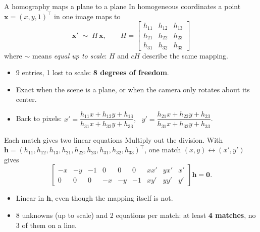 \documentclass[aspectratio=169,11pt]{beamer}
\begin{document}
\begin{frame}{A homography maps a plane to a plane}
  In homogeneous coordinates a point $\mathbf{x}=(x,y,1)^\top$ in one image maps to
  \[
    \mathbf{x}' \;\sim\; H\,\mathbf{x},\qquad
    H=\begin{bmatrix} h_{11}&h_{12}&h_{13}\\ h_{21}&h_{22}&h_{23}\\ h_{31}&h_{32}&h_{33}\end{bmatrix}
  \]
  where $\sim$ means \emph{equal up to scale}: $H$ and $cH$ describe the same mapping.
  \vspace{.6em}
  \begin{itemize}\setlength{\itemsep}{.45em}
    \item 9 entries, 1 lost to scale: \textbf{8 degrees of freedom}.
    \item Exact when the scene is a plane, or when the camera only rotates about its center.
    \item Back to pixels: $x'=\dfrac{h_{11}x+h_{12}y+h_{13}}{h_{31}x+h_{32}y+h_{33}}$, \ $y'=\dfrac{h_{21}x+h_{22}y+h_{23}}{h_{31}x+h_{32}y+h_{33}}$.
  \end{itemize}
\end{frame}

\begin{frame}{Each match gives two linear equations}
  Multiply out the division. With $\mathbf{h}=(h_{11},h_{12},h_{13},h_{21},h_{22},h_{23},h_{31},h_{32},h_{33})^\top$, one match $(x,y)\leftrightarrow(x',y')$ gives
  \[
    \begin{bmatrix}
      -x & -y & -1 & 0 & 0 & 0 & x x' & y x' & x'\\
      0 & 0 & 0 & -x & -y & -1 & x y' & y y' & y'
    \end{bmatrix}\mathbf{h}=\mathbf{0}.
  \]
  \begin{itemize}\setlength{\itemsep}{.45em}
    \item Linear in $\mathbf{h}$, even though the mapping itself is not.
    \item 8 unknowns (up to scale) and 2 equations per match: at least \textbf{4 matches}, no 3 of them on a line.
  \end{itemize}
\end{frame}
\end{document}
